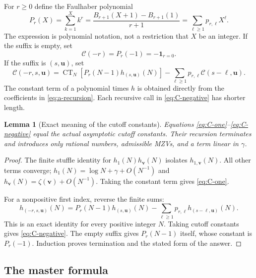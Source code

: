 \documentclass[11pt,letterpaper]{article}
\numberwithin{equation}{section}
\newtheorem{lemma}[theorem]{Lemma}
\theoremstyle{definition}\newtheorem{definition}[theorem]{Definition}
\theoremstyle{remark}\newtheorem{remark}[theorem]{Remark}
\DeclareMathOperator{\CT}{CT}
\begin{document}
For $r\ge0$ define the Faulhaber polynomial
\begin{equation}\label{eq:Faulhaber}
 P_r(X)=\sum_{k=1}^{X}k^r
 =\frac{B_{r+1}(X+1)-B_{r+1}(1)}{r+1}
 =\sum_{\ell\ge1}p_{r,\ell}X^\ell.
\end{equation}
The expression is polynomial notation, not a restriction that $X$
be an integer. If the suffix is empty, set
\begin{equation}\label{eq:C-empty}
 \mathcal C(-r)=P_r(-1)=-\mathbf1_{r=0}.
\end{equation}
If the suffix is $(s,\boldsymbol u)$, set
\begin{equation}\label{eq:C-negative}
 \mathcal C(-r,s,\boldsymbol u)
 =\CT_N\!\left[P_r(N-1)h_{(s,\boldsymbol u)}(N)\right]
   -\sum_{\ell\ge1}p_{r,\ell}
             \mathcal C(s-\ell,\boldsymbol u).
\end{equation}
The constant term of a polynomial times $h$ is obtained directly
from the coefficients in \eqref{eq:a-recursion}. Each recursive
call in \eqref{eq:C-negative} has shorter length.

\begin{lemma}[Exact meaning of the cutoff constants]\label{lem:C}
Equations \eqref{eq:C-one}--\eqref{eq:C-negative} equal the actual
asymptotic cutoff constants. Their recursion terminates and introduces
only rational numbers, admissible MZVs, and a term linear in $\gamma$.
\end{lemma}
\begin{proof}
The finite stuffle identity for $h_1(N)h_{\boldsymbol v}(N)$
isolates $h_{1,\boldsymbol v}(N)$. All other terms converge;
$h_1(N)=\log N+\gamma+O(N^{-1})$ and
$h_{\boldsymbol v}(N)=\zeta(\boldsymbol v)+O(N^{-1})$.
Taking the constant term gives \eqref{eq:C-one}.

For a nonpositive first index, reverse the finite sums:
\[
 h_{(-r,s,\boldsymbol u)}(N)
 =P_r(N-1)h_{(s,\boldsymbol u)}(N)
       -\sum_{\ell\ge1}p_{r,\ell}h_{(s-\ell,\boldsymbol u)}(N).
\]
This is an exact identity for every positive integer $N$.
Taking cutoff constants gives \eqref{eq:C-negative}. The empty
suffix gives $P_r(N-1)$ itself, whose constant is $P_r(-1)$.
Induction proves termination and the stated form of the answer.
\end{proof}

\subsection{The master formula}
\end{document}
